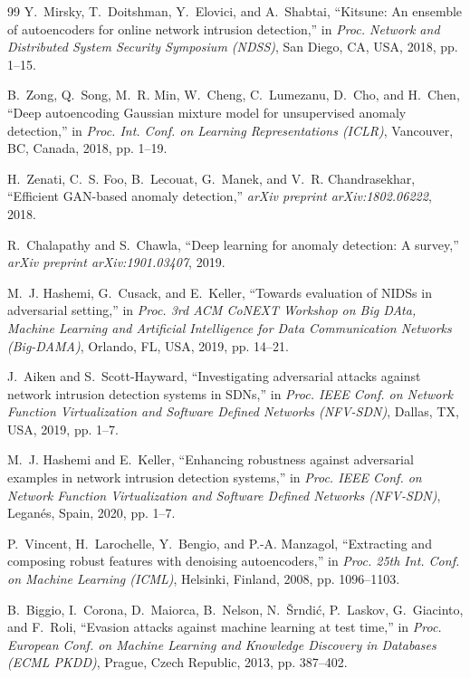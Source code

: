 \documentclass[conference]{IEEEtran}
\begin{document}
\begin{thebibliography}{99}
Y.~Mirsky, T.~Doitshman, Y.~Elovici, and A.~Shabtai, ``Kitsune: An ensemble of autoencoders for online network intrusion detection,'' in \emph{Proc. Network and Distributed System Security Symposium (NDSS)}, San Diego, CA, USA, 2018, pp. 1--15.

B.~Zong, Q.~Song, M.~R. Min, W.~Cheng, C.~Lumezanu, D.~Cho, and H.~Chen, ``Deep autoencoding Gaussian mixture model for unsupervised anomaly detection,'' in \emph{Proc. Int. Conf. on Learning Representations (ICLR)}, Vancouver, BC, Canada, 2018, pp. 1--19.

H.~Zenati, C.~S. Foo, B.~Lecouat, G.~Manek, and V.~R. Chandrasekhar, ``Efficient GAN-based anomaly detection,'' \emph{arXiv preprint arXiv:1802.06222}, 2018.

R.~Chalapathy and S.~Chawla, ``Deep learning for anomaly detection: A survey,'' \emph{arXiv preprint arXiv:1901.03407}, 2019.

M.~J. Hashemi, G.~Cusack, and E.~Keller, ``Towards evaluation of NIDSs in adversarial setting,'' in \emph{Proc. 3rd ACM CoNEXT Workshop on Big DAta, Machine Learning and Artificial Intelligence for Data Communication Networks (Big-DAMA)}, Orlando, FL, USA, 2019, pp. 14--21.

J.~Aiken and S.~Scott-Hayward, ``Investigating adversarial attacks against network intrusion detection systems in SDNs,'' in \emph{Proc. IEEE Conf. on Network Function Virtualization and Software Defined Networks (NFV-SDN)}, Dallas, TX, USA, 2019, pp. 1--7.

M.~J. Hashemi and E.~Keller, ``Enhancing robustness against adversarial examples in network intrusion detection systems,'' in \emph{Proc. IEEE Conf. on Network Function Virtualization and Software Defined Networks (NFV-SDN)}, Leganés, Spain, 2020, pp. 1--7.

P.~Vincent, H.~Larochelle, Y.~Bengio, and P.-A. Manzagol, ``Extracting and composing robust features with denoising autoencoders,'' in \emph{Proc. 25th Int. Conf. on Machine Learning (ICML)}, Helsinki, Finland, 2008, pp. 1096--1103.

B.~Biggio, I.~Corona, D.~Maiorca, B.~Nelson, N.~{\v{S}}rndi{\selectfont\'c}, P.~Laskov, G.~Giacinto, and F.~Roli, ``Evasion attacks against machine learning at test time,'' in \emph{Proc. European Conf. on Machine Learning and Knowledge Discovery in Databases (ECML PKDD)}, Prague, Czech Republic, 2013, pp. 387--402.


\end{thebibliography}
\end{document}
